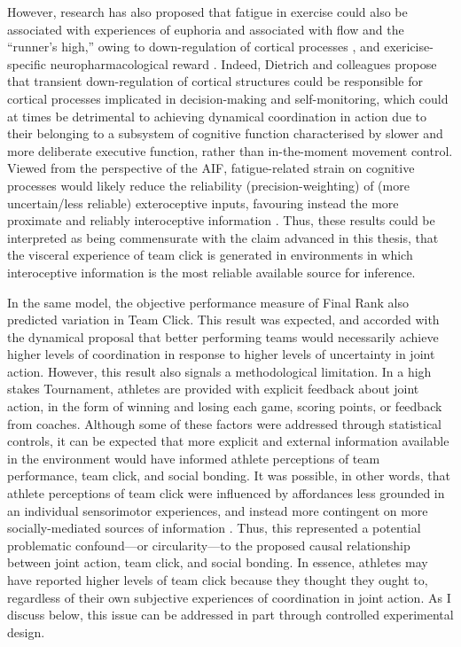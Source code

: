\begin{CJK}{UTF8}{gbsn}
However, research has also proposed that fatigue in exercise could also be associated with experiences of euphoria and associated with flow and the ``runner's high,'' owing to down-regulation of cortical processes \citep{Dietrich2011}, and exericise-specific neuropharmacological reward \citep{Raichlen2008}.  Indeed, Dietrich and colleagues propose that transient down-regulation of cortical structures could be responsible for cortical processes implicated in decision-making and self-monitoring, which could at times be detrimental to achieving dynamical coordination in action due to their belonging to a subsystem of cognitive function \citep[i.e., a deliberate ``system 2'' as opposed to more automatic and implicit ``system 1''; see ][]{Kahneman2011} characterised by slower and more deliberate executive function, rather than in-the-moment movement control.  Viewed from the perspective of the AIF, fatigue-related strain on cognitive processes would likely reduce the reliability (precision-weighting) of (more uncertain/less reliable) exteroceptive inputs, favouring instead the more proximate and reliably interoceptive information \citep{Pezullo2014,Barret2017}.  Thus, these results could be interpreted as being commensurate with the claim advanced in this thesis, that the visceral experience of team click is generated in environments in which interoceptive information is the most reliable available source for inference.

In the same model, the objective performance measure of Final Rank also predicted variation in Team Click.  This result was expected, and accorded with the dynamical proposal that better performing teams would necessarily achieve higher levels of coordination in response to higher levels of uncertainty in joint action.  However, this result also signals a methodological limitation.  In a high stakes Tournament, athletes are provided with explicit feedback about joint action, in the form of winning and losing each game, scoring points, or feedback from coaches.   Although some of these factors were addressed through statistical controls, it can be expected that more explicit and external information available in the environment would have informed athlete perceptions of team performance, team click, and social bonding.  It was possible, in other words, that athlete perceptions of team click were influenced by affordances less grounded in an individual sensorimotor experiences, and instead more contingent on more socially-mediated sources of information \citep{Ramstead2016}.  Thus, this represented a potential problematic confound—or circularity---to the proposed causal relationship between joint action, team click, and social bonding. In essence, athletes may have reported higher levels of team click because they thought they ought to, regardless of their own subjective experiences of coordination in joint action. As I discuss below, this issue can be addressed in part through controlled experimental design.



\end{CJK}
